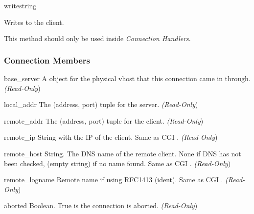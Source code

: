 \begin{methoddesc}[connection]{write}{string}

  Writes  to the client.

  This method should only be used inside \emph{Connection Handlers}.

\end{methoddesc}

\subsubsection{Connection Members\label{pyapi-mpconn-mem}}

\begin{memberdesc}[connection]{base_server}
  A  object for the physical vhost that this connection came in
  through.
  \emph{(Read-Only})
\end{memberdesc}

\begin{memberdesc}[connection]{local_addr}
  The (address, port) tuple for the server.
  \emph{(Read-Only})
\end{memberdesc}

\begin{memberdesc}[connection]{remote_addr}
  The (address, port) tuple for the client.
  \emph{(Read-Only})
\end{memberdesc}

\begin{memberdesc}[connection]{remote_ip}
  String with the IP of the client. Same as CGI .
  \emph{(Read-Only})
\end{memberdesc}

\begin{memberdesc}[connection]{remote_host}
  String. The DNS name of the remote client. None if DNS has not been
  checked,  (empty string) if no name found. Same as CGI .
  \emph{(Read-Only})
\end{memberdesc}

\begin{memberdesc}[connection]{remote_logname}
  Remote name if using RFC1413 (ident). Same as CGI .
  \emph{(Read-Only})
\end{memberdesc}

\begin{memberdesc}[connection]{aborted}
  Boolean. True is the connection is aborted.
  \emph{(Read-Only})
\end{memberdesc}

